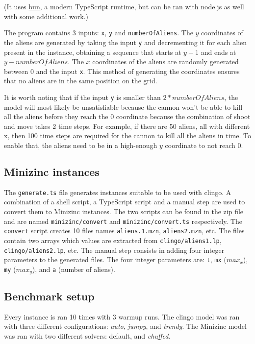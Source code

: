 \documentclass[11pt]{article}
\begin{document}
(It uses \href{https://bun.sh/}{bun}, a modern TypeScript runtime, but can be ran with node.js as well with some additional work.)

The program contains 3 inputs: \texttt{x}, \texttt{y} and \texttt{numberOfAliens}.
The $y$ coordinates of the aliens are generated by taking the input \texttt{y} and decrementing it for each alien present in the instance, obtaining a sequence that starts at $y - 1$ and ends at $y - numberOfAliens$.
The $x$ coordinates of the aliens are randomly generated between 0 and the input \texttt{x}.
This method of generating the coordinates ensures that no aliens are in the same position on the grid.

It is worth noting that if the input \texttt{y} is smaller than $2*numberOfAliens$, the model will most likely be unsatisfiable because the cannon won't be able to kill all the aliens before they reach the $0$ coordinate  because the combination of shoot and move takes 2 time steps.
For example, if there are 50 aliens, all with different x, then 100 time steps are required for the cannon to kill all the aliens in time.
To enable that, the aliens need to be in a high-enough $y$ coordinate to not reach 0.

\subsection{Minizinc instances}

The \texttt{generate.ts} file generates instances suitable to be used with clingo.
A combination of a shell script, a TypeScript script and a manual step are used to convert them to Minizinc instances.
The two scripts can be found in the zip file and are named \texttt{minizinc/convert} and \texttt{minizinc/convert.ts} respectively.
The \texttt{convert} script creates 10 files names \texttt{aliens.1.mzn}, \texttt{aliens2.mzn}, etc.
The files contain two arrays which values are extracted from \texttt{clingo/aliens1.lp}, \texttt{clingo/aliens2.lp}, etc.
The manual step consists in adding four integer parameters to the generated files.
The four integer parameters are: \texttt{t}, \texttt{mx} ($max_x$), \texttt{my} ($max_y$), and \texttt{a} (number of aliens).

\subsection{Benchmark setup}

Every instance is ran 10 times with 3 warmup runs.
The clingo model was ran with three different configurations: \textit{auto}, \textit{jumpy}, and \textit{trendy}.
The Minizinc model was ran with two different solvers: default, and \textit{chuffed}.
\end{document}
